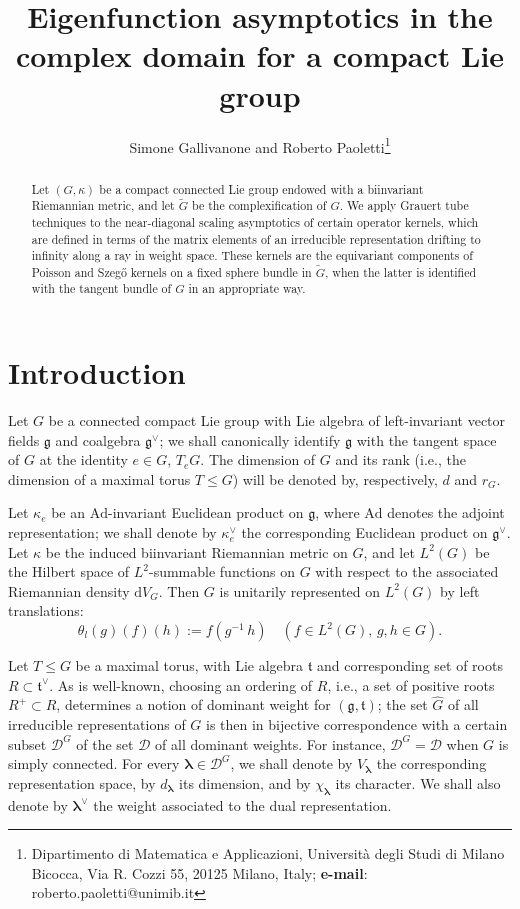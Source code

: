 \documentclass[12pt,a4paper]{article}
\title{Eigenfunction asymptotics in the complex domain for 
a compact Lie group}
\author{Simone Gallivanone and Roberto Paoletti\footnote{\noindent{\bf Address:}
Dipartimento di Matematica e Applicazioni, Universit\`a degli Studi
di Milano Bicocca, Via R. Cozzi 55, 20125 Milano,
Italy; {\bf e-mail}: roberto.paoletti@unimib.it }}
\date{}
\theoremstyle{plain}
\theoremstyle{definition}
\begin{document}
\maketitle

\begin{abstract}
Let $(G,\kappa)$ be a compact connected Lie group
endowed with a biinvariant Riemannian metric, and let $\tilde{G}$ be
the complexification of $G$.
We apply Grauert tube techniques to the near-diagonal scaling 
asymptotics of 
certain operator kernels, which are defined in terms of the matrix elements of an irreducible representation drifting
to infinity along a ray in weight space. These kernels are the equivariant components of Poisson and Szeg\H{o} kernels on a fixed sphere bundle
in $\tilde{G}$, when the latter is identified with the tangent bundle
of $G$ in an appropriate way.
\end{abstract}


\section{Introduction}

Let $G$ be a connected compact Lie group with Lie algebra
of left-invariant vector fields
$\mathfrak{g}$ and coalgebra $\mathfrak{g}^\vee$; 
we shall canonically identify $\mathfrak{g}$  
with the tangent space
of $G$ at the identity $e\in G$, $T_eG$.
The dimension of $G$ and its rank (i.e., the dimension of a maximal torus
$T\leqslant G$)
will be denoted by, respectively, $d$ and $r_G$.

Let $\kappa_e$ be an $\mathrm{Ad}$-invariant Euclidean
product on $\mathfrak{g}$,
where $\mathrm{Ad}$ denotes the adjoint representation;
we shall denote by $\kappa_e^\vee$ the corresponding
Euclidean product on $\mathfrak{g}^\vee$.
Let $\kappa$ be the
induced biinvariant Riemannian metric
on $G$, and let $L^2(G)$ be the 
Hilbert space of $L^2$-summable functions on
$G$ with respect to the associated Riemannian
density $\mathrm{d} V_G$.
Then $G$ is unitarily represented 
on $L^2(G)$ by left translations:
\begin{equation}
    \label{eqn:left translations}
    \theta_l(g)(f)(h):=f\left(g^{-1}\,h\right)
\quad (f\in L^2(G),\,g,h\in G).
\end{equation}


Let $T\leqslant G$ be a maximal torus, with Lie algebra
$\mathfrak{t}$ and corresponding set of roots $R\subset \mathfrak{t}^\vee$. As is well-known,
choosing an ordering of 
$R$, i.e., a set of positive roots $R^+\subset R$,
determines a notion of dominant weight for $(\mathfrak{g},
\mathfrak{t})$; the set
$\hat{G}$ of all irreducible representations of $G$
is then in bijective correspondence with a certain subset
$\mathcal{D}^G$ of the set $\mathcal{D}$
of all dominant weights.
For instance, $\mathcal{D}^G=\mathcal{D}$ when
$G$ is simply connected.
For every $\boldsymbol{\lambda}\in \mathcal{D}^G$,
we shall denote by $V_{\boldsymbol{\lambda}}$ the
corresponding representation space, by
$d_{\boldsymbol{\lambda}}$ its dimension, and by 
$\chi_{\boldsymbol{\lambda}}$ its character.
We shall also denote by
$\boldsymbol{\lambda}^\vee$
the weight associated to the dual representation.
\end{document}
